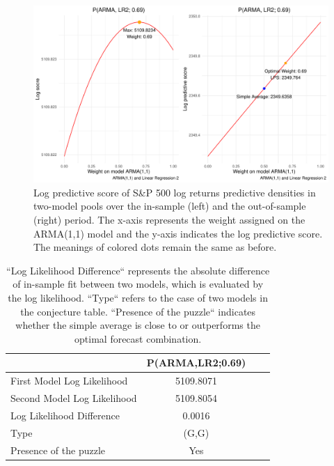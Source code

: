 \documentclass{monashthesis}
\begin{document}
\begin{figure}[ht]
\centering
\includegraphics[scale=0.6]{figures/SP500_stationary.pdf}
\caption{Log predictive score of S\&P 500 log returns predictive densities in two-model pools over the in-sample (left) and the out-of-sample (right) period. The x-axis represents the weight assigned on the ARMA(1,1) model and the y-axis indicates the log predictive score. The meanings of colored dots remain the same as before.}
\label{fig:stat}
\end{figure}

\begin{table}[ht]
  \centering
    \begin{tabular}{l|ccc}
    \toprule
                                    &     P(ARMA,LR2;0.69)    \\  
    \midrule
    First Model Log Likelihood      &         5109.8071       \\
    Second Model Log Likelihood     &         5109.8054       \\
    Log Likelihood Difference       &          0.0016         \\
    Type                            &          (G,G)          \\
    Presence of the puzzle          &           Yes           \\
    \bottomrule
    \end{tabular}
  \caption{``Log Likelihood Difference`` represents the absolute difference of in-sample fit between two models, which is evaluated by the log likelihood. ``Type`` refers to the case of two models in the conjecture table. ``Presence of the puzzle`` indicates whether the simple average is close to or outperforms the optimal forecast combination.}
  \label{tab:statfit}
\end{table}
\end{document}
